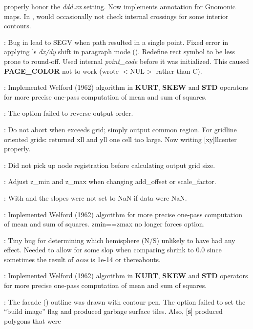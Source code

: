 \begin{description}
properly honor the \emph{ddd.xx} setting. Now implements annotation for Gnomonic maps.
In , would occasionally not check internal crossings for some interior contours.
\item [\GMTprog{pslib.c}]: Bug in  lead to SEGV when path resulted in a single point.
Fixed error in applying 's \emph{dx/dy} shift in paragraph mode ().
Redefine rect symbol to be less prone to round-off.
Used internal \emph{point\_code} before it was initialized.  This
caused \textbf{PAGE\_COLOR} not to work (wrote $<$NUL$>$ rather than C).
\item [\GMTprog{gmtmath.c}]: Implemented Welford (1962) algorithm in \textbf{KURT}, \textbf{SKEW} and \textbf{STD} operators
for more precise one-pass computation of mean and sum of squares.
\item [\GMTprog{gmtselect.c}]: The  option failed to reverse output order.
\item [\GMTprog{grd2xyz.c}]: Do not abort when  exceeds grid; simply output common region.
For gridline oriented grids:  returned xll and yll one cell too large. Now writing [xy]llcenter properly.
\item [\GMTprog{grdblend.c}]: Did not pick up node registration before calculating output grid size.
\item [\GMTprog{grdedit.c}]: Adjust z\_min and z\_max when changing add\_offset or scale\_factor.
\item [\GMTprog{grdgradient.c}]: With  and  the slopes were not set to NaN if data were NaN.
\item [\GMTprog{grdinfo.c}]: Implemented Welford (1962) algorithm for more precise one-pass
computation of mean and sum of squares.  zmin==zmax no longer forces  option.
\item [\GMTprog{grdmask.c}]: Tiny bug for determining which hemisphere (N/S) unlikely to have had any effect.
Needed to allow for some slop when comparing shrink to 0.0 since sometimes the result of \emph{acos} is 1e-14 or thereabouts.
\item [\GMTprog{grdmath.c}]: Implemented Welford (1962) algorithm in \textbf{KURT}, \textbf{SKEW} and \textbf{STD} operators
for more precise one-pass computation of mean and sum of squares.
\item [\GMTprog{grdview.c}]: The facade () outline was drawn with contour pen.
The  option failed to set the ``build image'' flag and produced
garbage surface tiles.  Also, [{\bf s}] produced polygons that were

\end{description}
